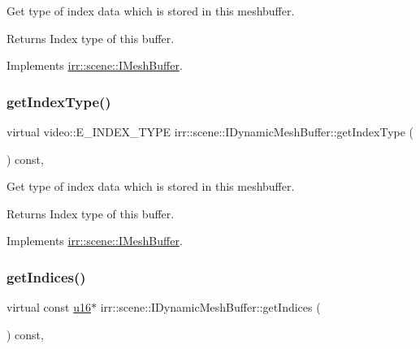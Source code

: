 Get type of index data which is stored in this meshbuffer. 

\begin{DoxyReturn}{Returns}
Index type of this buffer. 
\end{DoxyReturn}


Implements \hyperlink{classirr_1_1scene_1_1IMeshBuffer_a8a993431c2c35420b62a577dc18dbdc2}{irr\+::scene\+::\+I\+Mesh\+Buffer}.

\mbox{\label{classirr_1_1scene_1_1IDynamicMeshBuffer_a3ac73aed8c40103682c5c6388339e70d}} 
\subsubsection{\texorpdfstring{get\+Index\+Type()}{getIndexType()}\hspace{0.1cm}{\footnotesize\ttfamily [2/2]}}
{\footnotesize\ttfamily virtual video\+::\+E\+\_\+\+I\+N\+D\+E\+X\+\_\+\+T\+Y\+PE irr\+::scene\+::\+I\+Dynamic\+Mesh\+Buffer\+::get\+Index\+Type (\begin{DoxyParamCaption}{ }\end{DoxyParamCaption}) const\hspace{0.3cm}{\ttfamily [inline]}, {\ttfamily [virtual]}}



Get type of index data which is stored in this meshbuffer. 

\begin{DoxyReturn}{Returns}
Index type of this buffer. 
\end{DoxyReturn}


Implements \hyperlink{classirr_1_1scene_1_1IMeshBuffer_a8a993431c2c35420b62a577dc18dbdc2}{irr\+::scene\+::\+I\+Mesh\+Buffer}.

\mbox{\label{classirr_1_1scene_1_1IDynamicMeshBuffer_ab762d23eb5666125dad83ce20f15b4dd}} 
\subsubsection{\texorpdfstring{get\+Indices()}{getIndices()}\hspace{0.1cm}{\footnotesize\ttfamily [1/4]}}
{\footnotesize\ttfamily virtual const \hyperlink{namespaceirr_ae9f8ec82692ad3b83c21f555bfa70bcc}{u16}$\ast$ irr\+::scene\+::\+I\+Dynamic\+Mesh\+Buffer\+::get\+Indices (\begin{DoxyParamCaption}{ }\end{DoxyParamCaption}) const\hspace{0.3cm}{\ttfamily [inline]}, {\ttfamily [virtual]}}



